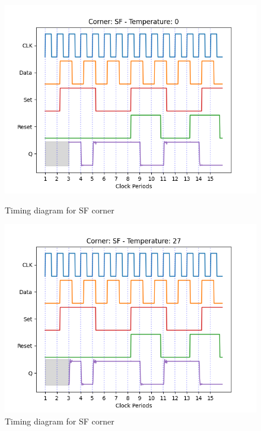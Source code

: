 \begin{figure}[H]
    \begin{minipage}{0.5\textwidth}
        \centering
        \includegraphics[width=\textwidth]{Figures/Aimspice_Plots/SF_0.png}
        \caption{Timing diagram for SF corner}
        \label{fig:SF0}
    \end{minipage}%
    \begin{minipage}{0.5\textwidth}
        \centering
        \includegraphics[width=\textwidth]{Figures/Aimspice_Plots/SF_27.png}
        \caption{Timing diagram for SF corner}
        \label{fig:SF27}
    \end{minipage}
\end{figure}
